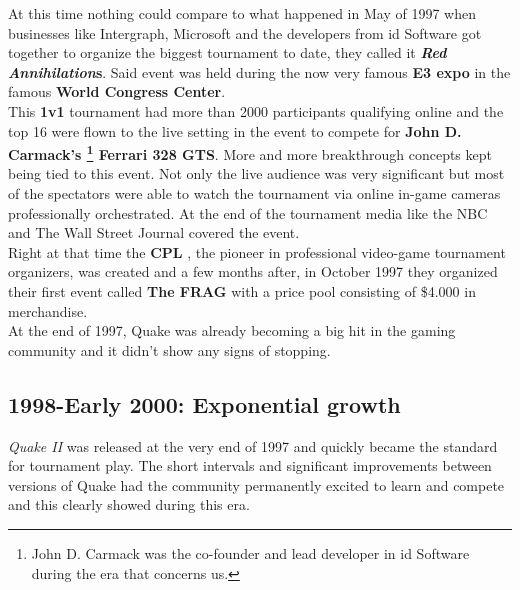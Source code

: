At this time nothing could compare to what happened in May of 1997 when businesses like Intergraph, Microsoft and the developers from id Software got together to organize the biggest tournament to date, they called it \textbf{\textit{Red Annihilation}s}. Said event was held during the now very famous \textbf{E3 expo} \cite{e3} in the famous \textbf{World Congress Center}.\\

This \textbf{1v1} tournament had more than 2000 participants qualifying online and the top 16 were flown to the live setting in the event to compete for \textbf{John D. Carmack's \footnote{John D. Carmack was the co-founder and lead developer in id Software during the era that concerns us.} Ferrari 328 GTS}. More and more breakthrough concepts kept being tied to this event. Not only the live audience was very significant but most of the spectators were able to watch the tournament via online in-game cameras professionally orchestrated. At the end of the tournament media like the NBC and The Wall Street Journal covered the event.\\

Right at that time the \textbf{CPL} \citep{web:cpl}, the pioneer in professional video-game tournament organizers, was created and a few months after, in October 1997 they organized their first event called \textbf{The FRAG} with a price pool consisting of \$4.000 in merchandise.\\

At the end of 1997, Quake was already becoming a big hit in the gaming community and it didn't show any signs of stopping.\\

\subsection{1998-Early 2000: Exponential growth}


\textit{Quake II} \citep{game:quake2} was released at the very end of 1997 and quickly became the standard for tournament play. The short intervals and significant improvements between versions of Quake had the community permanently excited to learn and compete and this clearly showed during this era.\\

